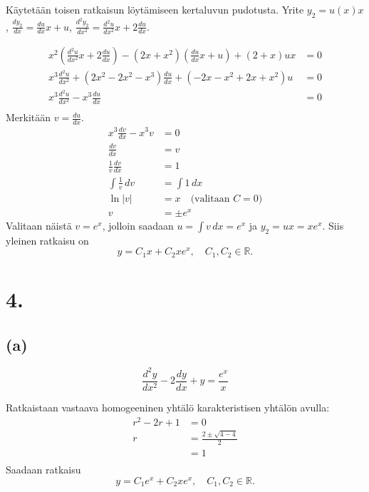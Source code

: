 \documentclass{article}
\begin{document}
Käytetään toisen ratkaisun löytämiseen kertaluvun pudotusta.
Yrite $y_2 = u(x)x$, $\frac{dy_2}{dx} = \frac{du}{dx}x + u$,
$\frac{d^2 y_2}{d x^2} = \frac{d^2 u}{d x^2}x + 2\frac{du}{dx}$.

\begin{align*}
  x^2(\frac{d^2 u}{d x^2}x + 2\frac{du}{dx})
    - (2x + x^2)(\frac{du}{dx}x + u)
    + (2 + x)ux &= 0 \\
  x^3\frac{d^2 u}{d x^2} + (2x^2 - 2x^2 - x^3)\frac{du}{dx} + (-2x - x^2 + 2x + x^2)u &= 0 \\
  x^3\frac{d^2 u}{d x^2} - x^3\frac{du}{dx} &= 0 \\
\end{align*}
Merkitään $v = \frac{du}{dx}$.
\begin{align*}
  x^3\frac{dv}{dx} - x^3v &= 0 \\
  \frac{dv}{dx} &= v \\
  \frac{1}{v}\frac{dv}{dx} &= 1 \\
  \int \frac{1}{v}\,dv &= \int 1\,dx \\
  \ln |v| &= x \quad \text{(valitaan $C=0$)} \\
  v &= \pm e^{x}
\end{align*}
Valitaan näistä $v = e^x$, jolloin saadaan
$u = \int v\,dx = e^x$ ja $y_2 = ux = xe^x$.
Siis yleinen ratkaisu on
\[
  y = C_1x + C_2xe^x, \quad C_1,C_2 \in \mathbb{R}.
\]

\section*{4.}

\subsection*{(a)}

\[
  \frac{d^2 y}{d x^2} - 2\frac{dy}{dx} + y = \frac{e^x}{x}
\]

Ratkaistaan vastaava homogeeninen yhtälö karakteristisen yhtälön avulla:
\begin{align*}
  r^2 - 2r + 1 &= 0 \\
  r &= \frac{2 \pm \sqrt{4 - 4}}{2} \\
    &= 1 \\
\end{align*}
Saadaan ratkaisu
\[
  y = C_1e^x + C_2xe^x, \quad C_1,C_2 \in \mathbb{R}.
\]
\end{document}

